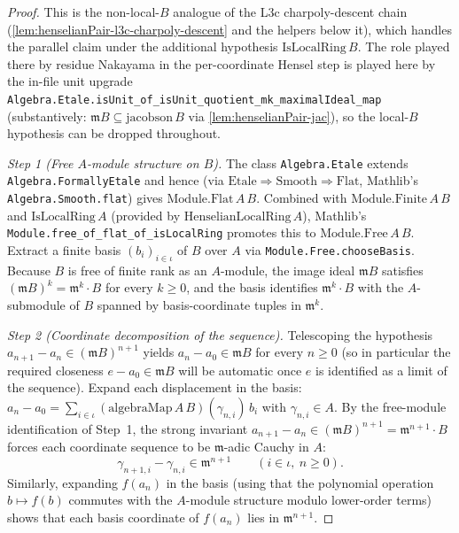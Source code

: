 \begin{proof}
\leanok
{}

This is the non-local-$B$ analogue of the L3c charpoly-descent chain
(\cref{lem:henselianPair-l3c-charpoly-descent} and the helpers below
it), which handles the parallel claim under the additional hypothesis
$\mathrm{IsLocalRing}\,B$. The role played there by residue Nakayama
in the per-coordinate Hensel step is played here by the in-file unit
upgrade
\texttt{Algebra.Etale.isUnit\_of\_isUnit\_quotient\_mk\_maximalIdeal\_map}
(substantively: $\mathfrak m B \subseteq \mathrm{jacobson}\,B$ via
\cref{lem:henselianPair-jac}), so the local-$B$ hypothesis can be
dropped throughout.

\emph{Step 1 (Free $A$-module structure on $B$).} The class
\texttt{Algebra.Etale} extends \texttt{Algebra.FormallyEtale} and hence
(via $\mathrm{Etale} \Rightarrow \mathrm{Smooth} \Rightarrow
\mathrm{Flat}$, Mathlib's \texttt{Algebra.Smooth.flat}) gives
$\mathrm{Module.Flat}\,A\,B$. Combined with
$\mathrm{Module.Finite}\,A\,B$ and $\mathrm{IsLocalRing}\,A$ (provided
by $\mathrm{HenselianLocalRing}\,A$), Mathlib's
\texttt{Module.free\_of\_flat\_of\_isLocalRing} promotes this to
$\mathrm{Module.Free}\,A\,B$. Extract a finite basis $(b_i)_{i \in
\iota}$ of $B$ over $A$ via \texttt{Module.Free.chooseBasis}. Because
$B$ is free of finite rank as an $A$-module, the image ideal
$\mathfrak m B$ satisfies $(\mathfrak m B)^k = \mathfrak m^k \cdot B$
for every $k \ge 0$, and the basis identifies $\mathfrak m^k \cdot B$
with the $A$-submodule of $B$ spanned by basis-coordinate tuples in
$\mathfrak m^k$.

\emph{Step 2 (Coordinate decomposition of the sequence).} Telescoping
the hypothesis $a_{n+1} - a_n \in (\mathfrak m B)^{n+1}$ yields $a_n -
a_0 \in \mathfrak m B$ for every $n \ge 0$ (so in particular the
required closeness $e - a_0 \in \mathfrak m B$ will be automatic once
$e$ is identified as a limit of the sequence). Expand each
displacement in the basis: $a_n - a_0 = \sum_{i \in \iota}
(\mathrm{algebraMap}\,A\,B)(\gamma_{n,i})\,b_i$ with $\gamma_{n,i} \in
A$. By the free-module identification of Step~1, the strong invariant
$a_{n+1} - a_n \in (\mathfrak m B)^{n+1} = \mathfrak m^{n+1} \cdot B$
forces each coordinate sequence to be $\mathfrak m$-adic Cauchy in
$A$:
\[
  \gamma_{n+1, i} - \gamma_{n, i} \in \mathfrak m^{n+1}
  \qquad (i \in \iota,\ n \ge 0).
\]
Similarly, expanding $f(a_n)$ in the basis (using that the polynomial
operation $b \mapsto f(b)$ commutes with the $A$-module structure
modulo lower-order terms) shows that each basis coordinate of $f(a_n)$
lies in $\mathfrak m^{n+1}$.


\end{proof}

